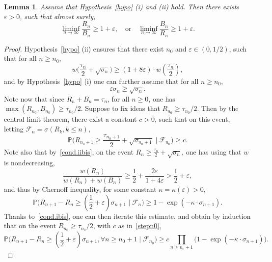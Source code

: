 \documentclass[10pt,a4paper]{amsart}
\newtheorem {lem} {Lemma} [section]
\newcommand{\1}{{\text{\Large $\mathfrak 1$}}}
\begin{document}
\begin{lem}\label{lem:loc1}
Assume that Hypothesis~\ref{hypo} (i) and (ii) hold. Then there exists $\varepsilon>0$, such that almost surely, 
$$\liminf_{n\to \infty} \frac{R_n}{B_n} \ge 1+\varepsilon,\quad  \text{or}\quad \liminf_{n\to \infty} \frac{B_n}{R_n} \ge 1+\varepsilon. $$ 
\end{lem}
\begin{proof}
Hypothesis~\ref{hypo} (ii) ensures that there exist $n_0$ and $\varepsilon\in(0,1/2)$, such that for all $n\ge n_0$, 
\begin{equation}\label{cond.iibis}
w\big( \frac{\tau_n}{2} + \sqrt{\sigma_n}\big) \ge (1+8\varepsilon)\cdot w(\frac{\tau_n}{2}),
\end{equation}
and by Hypothesis~\ref{hypo} (i) one can further assume that for all $n\ge n_0$, 
 \begin{equation}\label{cond.ibis}
\varepsilon \sigma_n \ge  \sqrt{\sigma_n}. 
\end{equation}
Note now that since $R_n + B_n = \tau_n$, for all $n\ge 0$, one has $\max(R_{n_0},B_{n_0}) \ge \tau_{n_0} /2$. Suppose to fix ideas that $R_{n_0} \ge \tau_{n_0} /2$. Then by the central limit theorem, 
there exist a constant $c>0$, such that on this event, letting $\mathcal F_n = \sigma(R_k,k\le n)$, 
\begin{equation}\label{stepn0}
\mathbb P\Big(R_{n_0+1} \ge \frac{\tau_{n_0+1}}{2} + \sqrt{\sigma_{n_0+1}}\mid \mathcal F_{n_0}\Big)\ge c.
\end{equation}
Note also that by~\eqref{cond.iibis}, on the event $R_n \ge \frac{\tau_n}{2} + \sqrt{\sigma_n}$, one has using that $w$ is nondecreasing, 
$$\frac{w(R_n)}{w(R_n) + w(B_n)}\ge \frac 12 + \frac{2\varepsilon}{1+4\varepsilon}> \frac 12 + \varepsilon, $$ 
and thus by Chernoff inequality, for some constant $\kappa=\kappa(\varepsilon)>0$, 
\begin{equation}\label{eq.chernoff}
\mathbb P\Big(R_{n+1} - R_n \ge (\frac 12 + \varepsilon ) \sigma_{n+1} \mid \mathcal F_n\Big) \ge 1 - \exp(- \kappa \cdot\sigma_{n+1}).  
\end{equation}
Thanks to~\eqref{cond.ibis}, one can then iterate this estimate, and obtain by induction that on the event $R_{n_0}\ge \tau_{n_0}/2$, with $c$ as in~\eqref{stepn0}, 
\begin{equation}\label{eq:c'}
\mathbb P\Big(R_{n+1}-R_n \ge (\frac 12 + \varepsilon ) \sigma_{n+1}, \forall n \ge n_0+1 \mid \mathcal F_{n_0}\Big)  \ge c \prod_{n\ge n_0+1} \big(1-\exp(- \kappa \cdot\sigma_{n+1})\big). 
\end{equation} 

\end{proof}
\end{document}
